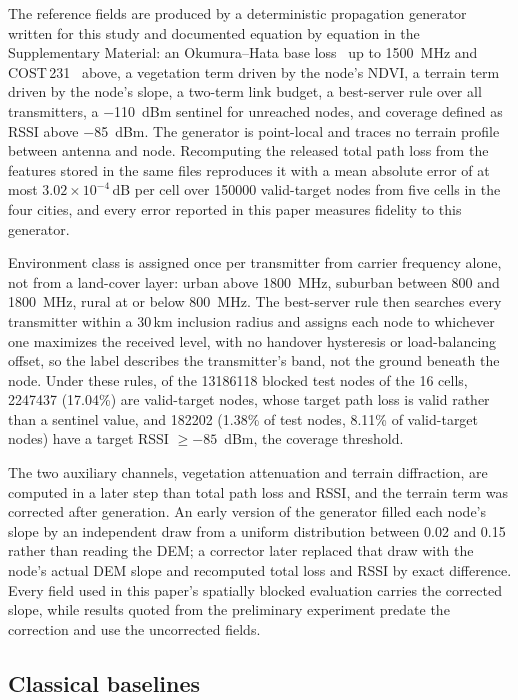 \documentclass{ieeeaccess}
\begin{document}
The reference fields are produced by a deterministic propagation generator written for this study and documented equation by equation in the Supplementary Material: an Okumura--Hata base loss~\cite{hata1980empirical} up to 1500~MHz and COST\,231~\cite{cost231} above, a vegetation term driven by the node's NDVI, a terrain term driven by the node's slope, a two-term link budget, a best-server rule over all transmitters, a $-$110~dBm sentinel for unreached nodes, and coverage defined as RSSI above $-$85~dBm. The generator is point-local and traces no terrain profile between antenna and node. Recomputing the released total path loss from the features stored in the same files reproduces it with a mean absolute error of at most $3.02 \times 10^{-4}$\,dB per cell over \num{150000} valid-target nodes from five cells in the four cities, and every error reported in this paper measures fidelity to this generator.

Environment class is assigned once per transmitter from carrier frequency alone, not from a land-cover layer: urban above 1800~MHz, suburban between 800 and 1800~MHz, rural at or below 800~MHz. The best-server rule then searches every transmitter within a 30\,km inclusion radius and assigns each node to whichever one maximizes the received level, with no handover hysteresis or load-balancing offset, so the label describes the transmitter's band, not the ground beneath the node. Under these rules, of the \num{13186118} blocked test nodes of the 16 cells, \num{2247437} (17.04\%) are valid-target nodes, whose target path loss is valid rather than a sentinel value, and \num{182202} (1.38\% of test nodes, 8.11\% of valid-target nodes) have a target RSSI $\geq -85$~dBm, the coverage threshold.

The two auxiliary channels, vegetation attenuation and terrain diffraction, are computed in a later step than total path loss and RSSI, and the terrain term was corrected after generation. An early version of the generator filled each node's slope by an independent draw from a uniform distribution between 0.02 and 0.15 rather than reading the DEM; a corrector later replaced that draw with the node's actual DEM slope and recomputed total loss and RSSI by exact difference. Every field used in this paper's spatially blocked evaluation carries the corrected slope, while results quoted from the preliminary experiment predate the correction and use the uncorrected fields.

\subsection{Classical baselines}
\end{document}
